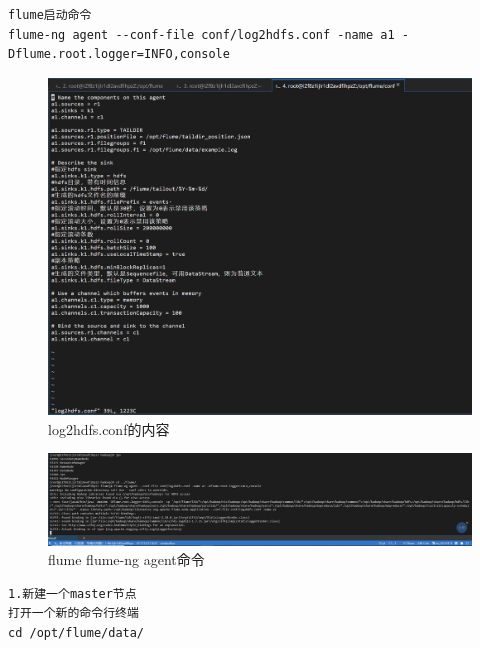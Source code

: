 \documentclass{article}
\begin{document}
\begin{enumerate}
\begin{lstlisting}
flume启动命令
flume-ng agent --conf-file conf/log2hdfs.conf -name a1 -Dflume.root.logger=INFO,console
    \end{lstlisting}
    \newpage
    \begin{figure}[htp]
        \centering
        \includegraphics[width=15cm]{log2hdfs.conf.png}
        \caption{log2hdfs.conf的内容}
        \label{pic6}
    \end{figure}
    \begin{figure}[htp]
        \centering
        \includegraphics[width=15cm]{flume_monitor.png}
        \caption{flume flume-ng agent命令}
        \label{pic5}
    \end{figure}
    \newpage
    \begin{lstlisting}
1.新建一个master节点
打开一个新的命令行终端
cd /opt/flume/data/


\end{lstlisting}
\end{enumerate}
\end{document}
